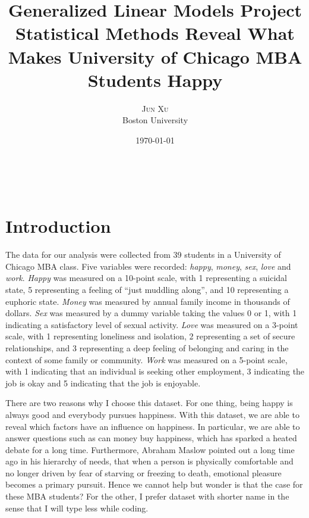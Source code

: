 \documentclass[11pt,letterpaper]{article}
\title{\textbf{Generalized Linear Models Project}\\
Statistical Methods Reveal What Makes University of Chicago MBA Students Happy}
\author{\textsc{Jun Xu}
\\{Boston University}}
\date{\today}
\makeatletter
\renewcommand{\maketitle}{
\begin{flushright}
{\LARGE\@title}

\vspace{50pt}

{\large\@author}
\\\@date

\vspace{40pt}
\end{flushright}
}
\makeatother
\begin{document}
\maketitle

\section{Introduction}
The data for our analysis were collected from 39 students in a University of Chicago MBA class. Five variables were recorded: \emph{happy}, \emph{money}, \emph{sex}, \emph{love} and \emph{work}. \emph{Happy} was measured on a 10-point scale, with 1 representing a suicidal state, 5 representing a feeling of ``just muddling along'', and 10 representing a euphoric state. \emph{Money} was measured by annual family income in thousands of dollars. \emph{Sex} was measured by a dummy variable taking the values 0 or 1, with 1 indicating a satisfactory level of sexual activity. \emph{Love} was measured on a 3-point scale, with 1 representing loneliness and isolation, 2 representing a set of secure relationships, and 3 representing a deep feeling of belonging and caring in the context of some family or community. \emph{Work} was measured on a 5-point scale, with 1 indicating that an individual is seeking other employment, 3 indicating the job is okay and 5 indicating that the job is enjoyable. \par
There are two reasons why I choose this dataset. For one thing, being happy is always good and everybody pursues happiness. With this dataset, we are able to reveal which factors have an influence on happiness. In particular, we are able to answer questions such as can money buy happiness, which has sparked a heated debate for a long time. Furthermore, Abraham Maslow pointed out a long time ago in his hierarchy of needs, that when a person is physically comfortable and no longer driven by fear of starving or freezing to death, emotional pleasure becomes a primary pursuit. Hence we cannot help but wonder is that the case for these MBA students? For the other, I prefer dataset with shorter name in the sense that I will type less while coding.
\end{document}
